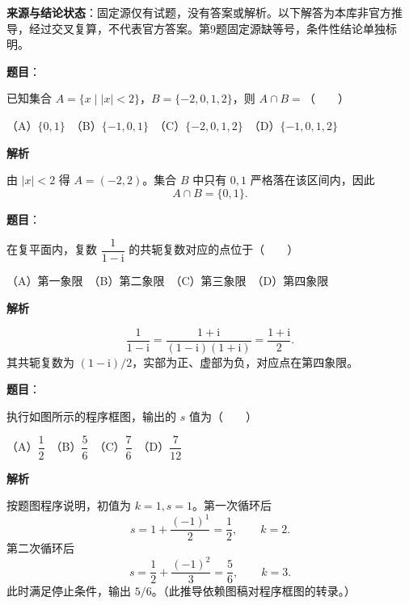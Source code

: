 

\begin{gktip}
\textbf{来源与结论状态}：固定源仅有试题，没有答案或解析。以下解答为本库非官方推导，经过交叉复算，不代表官方答案。第9题固定源缺等号，条件性结论单独标明。
\end{gktip}


\begin{answer}

\textbf{题目}：

已知集合 $A=\{x\mid |x|<2\}$，$B=\{-2,0,1,2\}$，则 $A\cap B=$\mbox{（　　）}

（A）$\{0,1\}$　（B）$\{-1,0,1\}$　（C）$\{-2,0,1,2\}$　（D）$\{-1,0,1,2\}$

\textbf{解析}

由 $|x|<2$ 得 $A=(-2,2)$。集合 $B$ 中只有 $0,1$ 严格落在该区间内，因此
\nopagebreak[4]
\[
A\cap B=\{0,1\}.
\]


\end{answer}
\begin{answer}

\textbf{题目}：

在复平面内，复数 $\dfrac{1}{1-\mathrm i}$ 的共轭复数对应的点位于\mbox{（　　）}

（A）第一象限　（B）第二象限　（C）第三象限　（D）第四象限

\textbf{解析}

\nopagebreak[4]
\[
\frac1{1-\mathrm i}=\frac{1+\mathrm i}{(1-\mathrm i)(1+\mathrm i)}=\frac{1+\mathrm i}{2}.
\]
其共轭复数为 $(1-\mathrm i)/2$，实部为正、虚部为负，对应点在第四象限。


\end{answer}
\begin{answer}

\textbf{题目}：

执行如图所示的程序框图，输出的 $s$ 值为\mbox{（　　）}
\nopagebreak[4]
\begin{center}\end{center}
\nopagebreak[4]
（A）$\dfrac12$　（B）$\dfrac56$　（C）$\dfrac76$　（D）$\dfrac7{12}$

\textbf{解析}

按题图程序说明，初值为 $k=1,s=1$。第一次循环后
\nopagebreak[4]
\[
s=1+\frac{(-1)^1}{2}=\frac12,\qquad k=2.
\]
第二次循环后
\nopagebreak[4]
\[
s=\frac12+\frac{(-1)^2}{3}=\frac56,\qquad k=3.
\]
此时满足停止条件，输出 $5/6$。（此推导依赖图稿对程序框图的转录。）


\end{answer}
